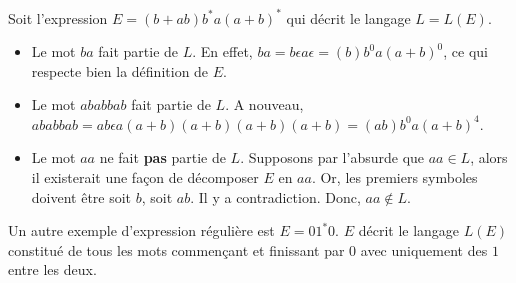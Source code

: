 \begin{example}
	Soit l'expression $E = (b+ab)b^*a(a+b)^*$ qui décrit le langage $L=L(E)$.\\
	\begin{itemize}
		\item Le mot $ba$ fait partie de $L$. En effet, $ba=b\epsilon a \epsilon=(b)b^0a(a+b)^0$, ce qui respecte bien la définition de $E$.
		\item Le mot $ababbab$ fait partie de $L$. A nouveau, $ababbab=ab\epsilon a (a+b)(a+b)(a+b)(a+b)=(ab)b^0a(a+b)^4$.
		\item Le mot $aa$ ne fait \textbf{pas} partie de $L$. Supposons par l'absurde que $aa \in L$, alors il existerait une façon de décomposer $E$ en $aa$. Or, les premiers symboles doivent être soit $b$, soit $ab$. Il y a contradiction. Donc, $aa \notin L$.
	\end{itemize}
	\label{ex:regex}
\end{example}

Un autre exemple d'expression régulière est $E=01^*0$. $E$ décrit le langage $L(E)$ constitué de tous les mots commençant et finissant par $0$ avec uniquement des $1$ entre les deux.

